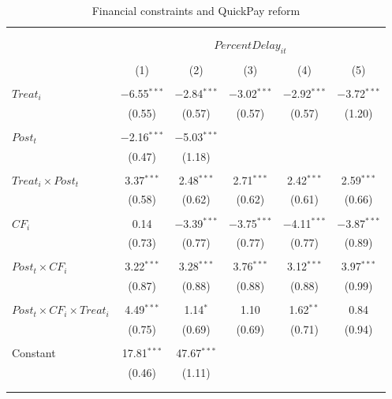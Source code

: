 \documentclass[
]{article}
\begin{document}
\begin{table}[H] \centering 
  \caption{Financial constraints and QuickPay reform} 
  \label{} 
\small 
\begin{tabular}{@{\extracolsep{-2pt}}lccccc} 
\\[-1.8ex]\hline 
\hline \\[-1.8ex] 
\\[-1.8ex] & \multicolumn{5}{c}{$PercentDelay_{it}$  } \\ 
\\[-1.8ex] & (1) & (2) & (3) & (4) & (5)\\ 
\hline \\[-1.8ex] 
 $Treat_i$ & $-$6.55$^{***}$ & $-$2.84$^{***}$ & $-$3.02$^{***}$ & $-$2.92$^{***}$ & $-$3.72$^{***}$ \\ 
  & (0.55) & (0.57) & (0.57) & (0.57) & (1.20) \\ 
  & & & & & \\ 
 $Post_t$ & $-$2.16$^{***}$ & $-$5.03$^{***}$ &  &  &  \\ 
  & (0.47) & (1.18) &  &  &  \\ 
  & & & & & \\ 
 $Treat_i \times Post_t$ & 3.37$^{***}$ & 2.48$^{***}$ & 2.71$^{***}$ & 2.42$^{***}$ & 2.59$^{***}$ \\ 
  & (0.58) & (0.62) & (0.62) & (0.61) & (0.66) \\ 
  & & & & & \\ 
 $CF_i$ & 0.14 & $-$3.39$^{***}$ & $-$3.75$^{***}$ & $-$4.11$^{***}$ & $-$3.87$^{***}$ \\ 
  & (0.73) & (0.77) & (0.77) & (0.77) & (0.89) \\ 
  & & & & & \\ 
 $Post_t \times CF_i$ & 3.22$^{***}$ & 3.28$^{***}$ & 3.76$^{***}$ & 3.12$^{***}$ & 3.97$^{***}$ \\ 
  & (0.87) & (0.88) & (0.88) & (0.88) & (0.99) \\ 
  & & & & & \\ 
 $Post_t \times CF_i \times Treat_i$ & 4.49$^{***}$ & 1.14$^{*}$ & 1.10 & 1.62$^{**}$ & 0.84 \\ 
  & (0.75) & (0.69) & (0.69) & (0.71) & (0.94) \\ 
  & & & & & \\ 
 Constant & 17.81$^{***}$ & 47.67$^{***}$ &  &  &  \\ 
  & (0.46) & (1.11) &  &  &  \\ 
  & & & & & \\ 
\hline \\[-1.8ex] 

\end{tabular}
\end{table}
\end{document}
